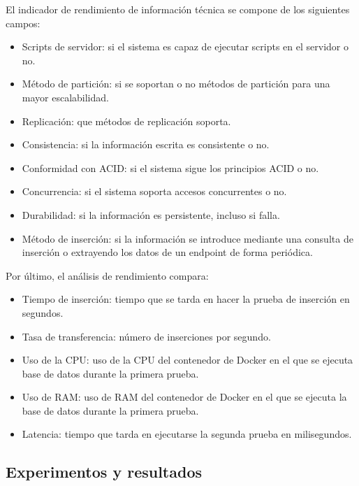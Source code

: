 El indicador de rendimiento de información técnica se compone de los siguientes campos:
\begin{itemize}
    \item Scripts de servidor: si el sistema es capaz de ejecutar scripts en el servidor o no.
    \item Método de partición: si se soportan o no métodos de partición para una mayor escalabilidad.
    \item Replicación: que métodos de replicación soporta.
    \item Consistencia: si la información escrita es consistente o no.
    \item Conformidad con ACID: si el sistema sigue los principios ACID o no.
    \item Concurrencia: si el sistema soporta accesos concurrentes o no.
    \item Durabilidad: si la información es persistente, incluso si falla.
    \item Método de inserción: si la información se introduce mediante una consulta de inserción o extrayendo los
        datos de un endpoint de forma periódica.
\end{itemize}


Por último, el análisis de rendimiento compara:
\begin{itemize}
    \item Tiempo de inserción: tiempo que se tarda en hacer la prueba de inserción en segundos.
    \item Tasa de transferencia: número de inserciones por segundo.
    \item Uso de la CPU: uso de la CPU del contenedor de Docker en el que se ejecuta base de datos durante 
        la primera prueba.
    \item Uso de RAM: uso de RAM del contenedor de Docker en el que se ejecuta la base de datos durante la
        primera prueba.
    \item Latencia: tiempo que tarda en ejecutarse la segunda prueba en milisegundos.
\end{itemize}

\subsection{Experimentos y resultados}

